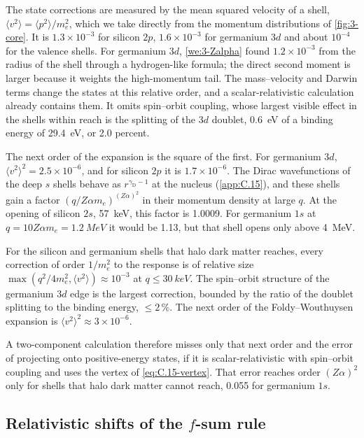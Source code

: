 The state corrections are measured by the mean squared velocity of a shell, $\langle v^2\rangle = \langle p^2\rangle/m_e^2$, which we take directly from the momentum distributions of \cref{fig:3-core}. It is $1.3\times10^{-3}$ for silicon $2p$, $1.6\times10^{-3}$ for germanium $3d$ and about $10^{-4}$ for the valence shells. For germanium $3d$, \cref{we:3-Zalpha} found $1.2\times10^{-3}$ from the radius of the shell through a hydrogen-like formula; the direct second moment is larger because it weights the high-momentum tail. The mass--velocity and Darwin terms change the states at this relative order, and a scalar-relativistic calculation already contains them. It omits spin--orbit coupling, whose largest visible effect in the shells within reach is the splitting of the $3d$ doublet, \SI{0.6}{eV} of a binding energy of \SI{29.4}{eV}, or 2.0 percent.

The next order of the expansion is the square of the first. For germanium $3d$, $\langle v^2\rangle^2 = 2.5\times10^{-6}$, and for silicon $2p$ it is $1.7\times10^{-6}$. The Dirac wavefunctions of the deep $s$ shells behave as $r^{\gamma_{\mathrm{D}} - 1}$ at the nucleus (\cref{app:C.15}), and these shells gain a factor $(q/Z\alpha m_e)^{(Z\alpha)^2}$ in their momentum density at large $q$. At the opening of silicon $2s$, \SI{57}{keV}, this factor is 1.0009. For germanium $1s$ at $q = 10Z\alpha m_e = \SI{1.2}{MeV}$ it would be 1.13, but that shell opens only above \SI{4}{MeV}.
\begin{keyresult}
For the silicon and germanium shells that halo dark matter reaches, every correction of order $1/m_e^2$ to the response is of relative size $\max(q^2/4m_e^2, \langle v^2\rangle) \approx 10^{-3}$ at $q \le \SI{30}{keV}$. The spin--orbit structure of the germanium $3d$ edge is the largest correction, bounded by the ratio of the doublet splitting to the binding energy, $\le 2\,\%$. The next order of the Foldy--Wouthuysen expansion is $\langle v^2\rangle^2 \approx 3\times10^{-6}$.
\end{keyresult}
\noindent A two-component calculation therefore misses only that next order and the error of projecting onto positive-energy states, if it is scalar-relativistic with spin--orbit coupling and uses the vertex of \cref{eq:C.15-vertex}. That error reaches order $(Z\alpha)^2$ only for shells that halo dark matter cannot reach, 0.055 for germanium $1s$.

\subsection{Relativistic shifts of the $f$-sum rule}\label{sec:10.6-fsum}

